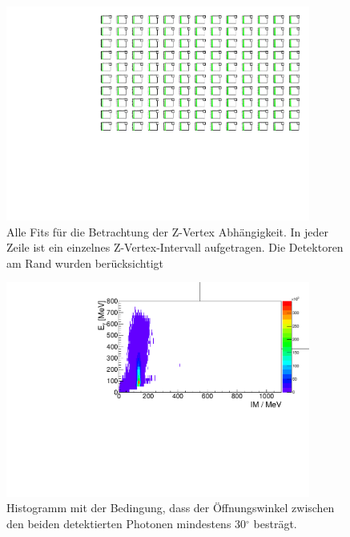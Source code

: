 \documentclass[a4paper,11pt,oneside,final,german,openbib,pdftex]{scrbook}
\begin{document}
{\begin{appendix}
\begin{figure}[h!]
	\begin{center}
		\includegraphics[width=100mm]{NewCalib/20171904ZVertexAllFits}
		\caption[Simulation: Z-Vertex alle Fits]{Alle Fits f\"ur die Betrachtung der Z-Vertex Abh\"angigkeit. In jeder Zeile ist ein einzelnes Z-Vertex-Intervall aufgetragen. Die Detektoren am Rand wurden ber\"ucksichtigt}
		\label{fig:ZVertex-All-Fits}
	\end{center}
\end{figure}

\begin{figure}[h!]
	\begin{center}
		\includegraphics[width=100mm]{NewCalib/20171904SimMinOpeningAngleHist}
		\caption[Simulation: 2D-Hist \"Offnungswinkel $>$ 30$^{\circ}$]{Histogramm mit der Bedingung, dass der \"Offnungswinkel zwischen den beiden detektierten Photonen mindestens 30$^\circ$ bestr\"agt.}
	\end{center}
\end{figure}


\end{appendix}}
\end{document}
